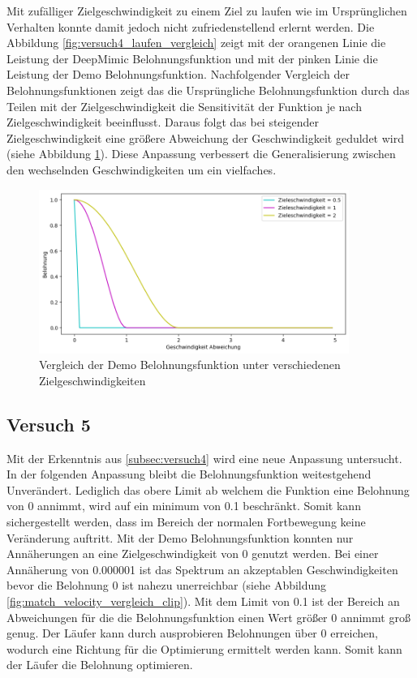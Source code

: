 Mit zufälliger Zielgeschwindigkeit zu einem Ziel zu laufen wie im Ursprünglichen Verhalten konnte damit jedoch nicht zufriedenstellend erlernt werden. Die Abbildung \ref{fig:versuch4_laufen_vergleich} zeigt mit der orangenen Linie die Leistung der DeepMimic Belohnungsfunktion und mit der pinken Linie die Leistung der Demo Belohnungsfunktion. Nachfolgender Vergleich der Belohnungsfunktionen zeigt das die Ursprüngliche Belohnungsfunktion durch das Teilen mit der Zielgeschwindigkeit die Sensitivität der Funktion je nach Zielgeschwindigkeit beeinflusst. Daraus folgt das bei steigender Zielgeschwindigkeit eine größere Abweichung der Geschwindigkeit geduldet wird (siehe Abbildung \ref{fig:match_velocity_demo_vergleich}). Diese Anpassung verbessert die Generalisierung zwischen den wechselnden Geschwindigkeiten um ein vielfaches.

\begin{figure}[H]
  \centering  
  \includegraphics[width=0.9\textwidth]{img/match_velocity_demo_vergleich}
  \caption{Vergleich der Demo Belohnungsfunktion unter verschiedenen Zielgeschwindigkeiten}
  \label{fig:match_velocity_demo_vergleich}
\end{figure}

\subsection{Versuch 5}
Mit der Erkenntnis aus \ref{subsec:versuch4} wird eine neue Anpassung untersucht. In der folgenden Anpassung bleibt die Belohnungsfunktion weitestgehend Unverändert. Lediglich das obere Limit ab welchem die Funktion eine Belohnung von 0 annimmt, wird auf ein minimum von 0.1 beschränkt. Somit kann sichergestellt werden, dass im Bereich der normalen Fortbewegung keine Veränderung auftritt. Mit der Demo Belohnungsfunktion konnten nur Annäherungen an eine Zielgeschwindigkeit von 0 genutzt werden. Bei einer Annäherung von 0.000001 ist das Spektrum an akzeptablen Geschwindigkeiten bevor die Belohnung 0 ist nahezu unerreichbar (siehe Abbildung \ref{fig:match_velocity_vergleich_clip}). Mit dem Limit von 0.1 ist der Bereich an Abweichungen für die die Belohnungsfunktion einen Wert größer 0 annimmt groß genug. Der Läufer kann durch ausprobieren Belohnungen über 0 erreichen, wodurch eine Richtung für die Optimierung ermittelt werden kann. Somit kann der Läufer die Belohnung optimieren.\\

